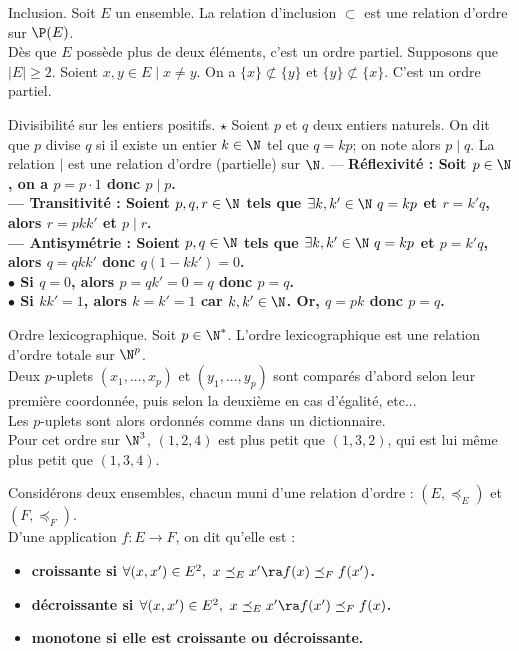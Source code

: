 \documentclass[11pt]{article}
\begin{document}
\pagebreak

\begin{ex}{Inclusion.}{}
    Soit $E$ un ensemble. La relation d'inclusion $\subset$ est une relation d'ordre sur $\P(E)$.\\
    Dès que $E$ possède plus de deux éléments, c'est un ordre partiel.
    \tcblower
    Supposons que $|E|\geq2$. Soient $x,y\in E \mid x\neq y$. On a $\{x\}\not\subset\{y\}$ et $\{y\}\not\subset\{x\}$. C'est un ordre partiel.
\end{ex}

\begin{ex}{Divisibilité sur les entiers positifs. $\star$}{}
    Soient $p$ et $q$ deux entiers naturels. On dit que $p$ divise $q$ si il existe un entier $k\in\N$ tel que $q=kp$; on note alors $p\mid q$. La relation $\mid$ est une relation d'ordre (partielle) sur $\N$.
    \tcblower
    --- \bf{Réflexivité :} Soit $p\in\N$, on a $p=p\cdot1$ donc $p\mid p$.\\
    --- \bf{Transitivité :} Soient $p,q,r\in\N$ tels que $\exists k,k' \in \N ~ q=kp$ et $r=k'q$, alors $r=pkk'$ et $p\mid r$.\\
    --- \bf{Antisymétrie :} Soient $p,q\in\N$ tels que $\exists k,k'\in\N ~ q=kp$ et $p=k'q$, alors $q=qkk'$ donc $q(1-kk')=0$.\\
    $\bullet$ Si $q=0$, alors $p=qk'=0=q$ donc $p=q$.\\
    $\bullet$ Si $kk'=1$, alors $k=k'=1$ car $k,k'\in\N$. Or, $q=pk$ donc $p=q$.
\end{ex}

\begin{ex}{Ordre lexicographique.}{}
    Soit $p\in\N^*$. L'ordre lexicographique est une relation d'ordre totale sur $\N^p$.\\
    Deux $p$-uplets $(x_1,...,x_p)$ et $(y_1,...,y_p)$ sont comparés d'abord selon leur première coordonnée, puis selon la deuxième en cas d'égalité, etc...\\
    Les $p$-uplets sont alors ordonnés comme dans un dictionnaire.\\
    Pour cet ordre sur $\N^3$, $(1,2,4)$ est plus petit que $(1,3,2)$, qui est lui même plus petit que $(1,3,4)$.
\end{ex}

\begin{defi}{}{}
    Considérons deux ensembles, chacun muni d'une relation d'ordre : $(E,\preceq_E)$ et $(F,\preceq_F)$.\\
    D'une application $f:E\to F$, on dit qu'elle est :
    \begin{itemize}
        \item \bf{croissante} si $\forall (x,x')\in E^2, ~ x \preceq_E x' \ra f(x) \preceq_F f(x')$.
        \item \bf{décroissante} si $\forall (x,x')\in E^2, ~ x \preceq_E x' \ra f(x') \preceq_F f(x)$.
        \item \bf{monotone} si elle est croissante ou décroissante.
    \end{itemize}
\end{defi}
\end{document}
